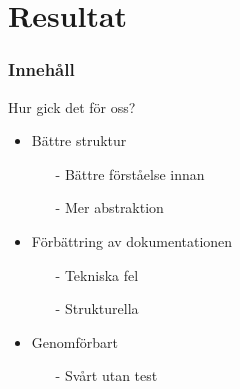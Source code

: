 \section{Resultat}
\begin{frame}
\frametitle{Innehåll}
\tableofcontents[currentsection]
\end{frame}

\begin{frame}{Hur gick det för oss?}

\begin{itemize}
\item Bättre struktur
\begin{itemize}
	\item[-] Bättre förståelse innan
	\item[-] Mer abstraktion
\end{itemize}
\item Förbättring av dokumentationen
\begin{itemize}
	\item[-] Tekniska fel
	\item[-] Strukturella
\end{itemize}
\item Genomförbart
\begin{itemize}
	\item[-] Svårt utan test
\end{itemize}
\end{itemize}

\end{frame}
